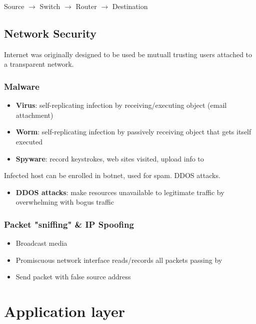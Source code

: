 \documentclass[11pt]{article}
\begin{document}
Source \(\rightarrow\)     Switch \(\rightarrow\)      Router \(\rightarrow\)     Destination 


\subsection{Network Security}
\label{sec:org32a19fa}

Internet was originally designed to be used be mutuall trusting users
attached to a transparent network.

\subsubsection{Malware}
\label{sec:orgc7a1ea8}
\begin{itemize}
\item \textbf{Virus}: self-replicating infection by receiving/executing object
(email attachment)
\item \textbf{Worm}: self-replicating infection by passively receiving object
that gets itself executed
\item \textbf{Spyware}: record keystrokes, web sites visited, upload info to
\end{itemize}

Infected host can be enrolled in botnet, used for spam. DDOS attacks.

\begin{itemize}
\item \textbf{DDOS attacks}: make resources unavailable to legitimate traffic by
overwhelming with bogus traffic
\end{itemize}

\subsubsection{Packet "sniffing" \& IP Spoofing}
\label{sec:org89907cd}
\begin{itemize}
\item Broadcast media
\item Promiscuous network interface reads/records all packets passing by
\item Send packet with false source address
\end{itemize}




\section{Application layer}
\label{sec:orge82cbb3}
\end{document}
